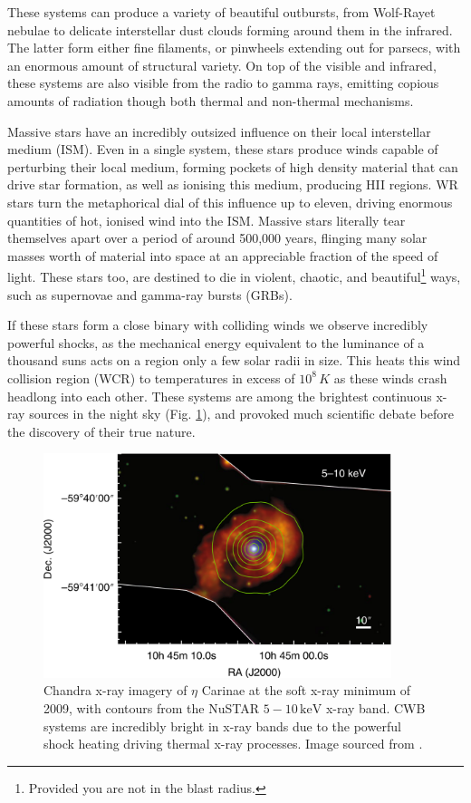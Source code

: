 These systems can produce a variety of beautiful outbursts, from Wolf-Rayet nebulae to delicate interstellar dust clouds forming around them in the infrared.
The latter form either fine filaments, or pinwheels extending out for parsecs, with an enormous amount of structural variety.
On top of the visible and infrared, these systems are also visible from the radio to gamma rays, emitting copious amounts of radiation though both thermal and non-thermal mechanisms.

Massive stars have an incredibly outsized influence on their local interstellar medium (ISM).
Even in a single system, these stars produce winds capable of perturbing their local medium, forming pockets of high density material that can drive star formation, as well as ionising this medium, producing HII regions.
WR stars turn the metaphorical dial of this influence up to eleven, driving enormous quantities of hot, ionised wind into the ISM.
Massive stars literally tear themselves apart over a period of around 500,000 years, flinging many solar masses worth of material into space at an appreciable fraction of the speed of light.
These stars too, are destined to die in violent, chaotic, and beautiful\footnote{Provided you are not in the blast radius.} ways, such as supernovae and gamma-ray bursts (GRBs).

If these stars form a close binary with colliding winds we observe incredibly powerful shocks, as the mechanical energy equivalent to the luminance of a thousand suns acts on a region only a few solar radii in size.
This heats this wind collision region (WCR) to temperatures in excess of $10^8 \, \si{K}$ as these winds crash headlong into each other.
These systems are among the brightest continuous x-ray sources in the night sky (Fig. \ref{fig:intro-xray}), and provoked much scientific debate before the discovery of their true nature. 

\begin{figure}[ht]
  \centering
  \includegraphics[width=4in]{assets/wolf-rayets/x-ray.png}
  \caption[\emph{Chandra \& NuSTAR imagery of $\eta$ Carinae \parencite{hamaguchiNonthermalXraysColliding2018}}]{Chandra x-ray imagery of $\eta$ Carinae at the soft x-ray minimum of 2009, with contours from the NuSTAR $5-10 \, \si{\kilo\electronvolt}$ x-ray band. CWB systems are incredibly bright in x-ray bands due to the powerful shock heating driving thermal x-ray processes. Image sourced from \textcite{hamaguchiNonthermalXraysColliding2018}.}
  \label{fig:intro-xray}
\end{figure}

